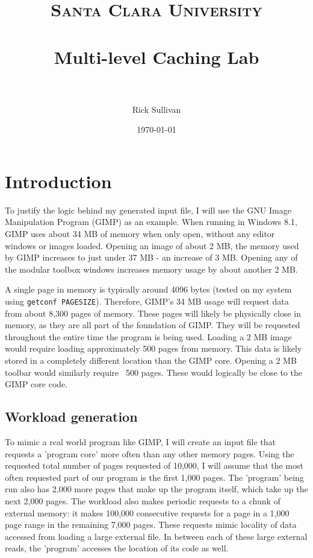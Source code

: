 \documentclass[paper=a4, fontsize=11pt]{scrartcl} %
\title{ 
\normalfont \normalsize 
\textsc{Santa Clara University} \\ [25pt] %
\horrule{0.5pt} \\[0.4cm] %
\huge Multi-level Caching Lab\\ %
\horrule{2pt} \\[0.5cm] %
}
\author{Rick Sullivan} %
\date{\normalsize\today} %
\numberwithin{equation}{section} %
\numberwithin{figure}{section} %
\numberwithin{table}{section} %
\begin{document}
\maketitle %


\section{Introduction}
To justify the logic behind my generated input file, I will use the GNU Image Manipulation Program (GIMP) as an example. When running in Windows 8.1, GIMP uses about 34 MB of memory when only open, without any editor windows or images loaded. Opening an image of about 2 MB, the memory used by GIMP increases to just under 37 MB - an increase of 3 MB. Opening any of the modular toolbox windows increases memory usage by about another 2 MB.

A single page in memory is typically around 4096 bytes (tested on my system using \texttt{getconf PAGESIZE}). Therefore, GIMP's 34 MB usage will request data from about 8,300 pages of memory. These pages will likely be physically close in memory, as they are all part of the foundation of GIMP. They will be requested throughout the entire time the program is being used. Loading a 2 MB image would require loading approximately 500 pages from memory. This data is likely stored in a completely different location than the GIMP core. Opening a 2 MB toolbar would similarly require ~500 pages. These would logically be close to the GIMP core code.

\subsection{Workload generation}
To mimic a real world program like GIMP, I will create an input file that requests a 'program core' more often than any other memory pages. Using the requested total number of pages requested of 10,000, I will assume that the most often requested part of our program is the first 1,000 pages. The 'program' being run also has 2,000 more pages that make up the program itself, which take up the next 2,000 pages. The workload also makes periodic requests to a chunk of external memory: it makes 100,000 consecutive requests for a page in a 1,000 page range in the remaining 7,000 pages. These requests mimic locality of data accessed from loading a large external file. In between each of these large external reads, the 'program' accesses the location of its code as well.
\end{document}
